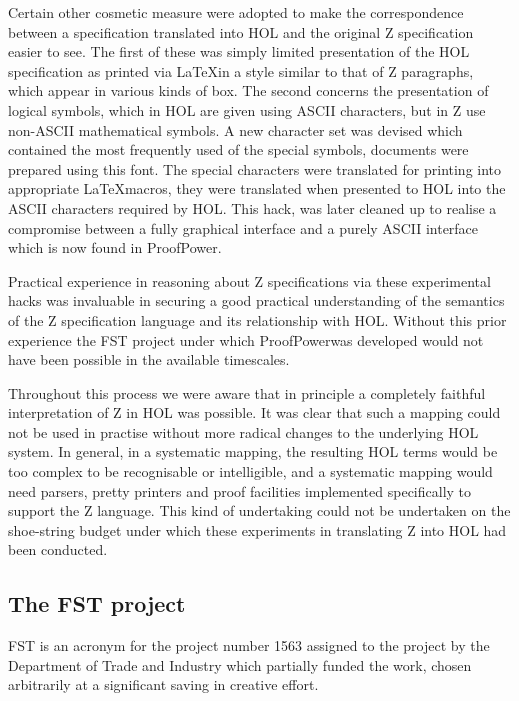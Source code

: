 \documentclass[10pt,titlepage]{book}
\def\Product{ProofPower}
\begin{document}
Certain other cosmetic measure were adopted to make the correspondence between a specification translated into HOL and the original Z specification easier to see.
The first of these was simply limited presentation of the HOL specification as printed via \LaTeX in a style similar to that of Z paragraphs, which appear in various kinds of box.
The second concerns the presentation of logical symbols, which in HOL are given using ASCII characters, but in Z use non-ASCII mathematical symbols.
A new character set was devised which contained the most frequently used of the special symbols, documents were prepared using this font.
The special characters were translated for printing into appropriate \LaTeX macros, they were translated when presented to HOL into the ASCII characters required by HOL.
This hack, was later cleaned up to realise a compromise between a fully graphical interface and a purely ASCII interface which is now found in \Product.

Practical experience in reasoning about Z specifications via these experimental hacks was invaluable in securing a good practical understanding of the semantics of the Z specification language and its relationship with HOL.
Without this prior experience the FST project under which \Product was developed would not have been possible in the available timescales.

Throughout this process we were aware that in principle a completely faithful interpretation of Z in HOL was possible.
It was clear that such a mapping could not be used in practise without more radical changes to the underlying HOL system.
In general, in a systematic mapping, the resulting HOL terms would be too complex to be recognisable or intelligible, and a systematic mapping would need parsers, pretty printers and proof facilities implemented specifically to support the Z language.
This kind of undertaking could not be undertaken on the shoe-string budget under which these experiments in translating Z into HOL had been conducted.

\subsection{The FST project}

FST is an acronym for the project number 1563 assigned to the project by the Department of Trade and Industry which partially funded the work, chosen arbitrarily at a significant saving in creative effort.
\end{document}
